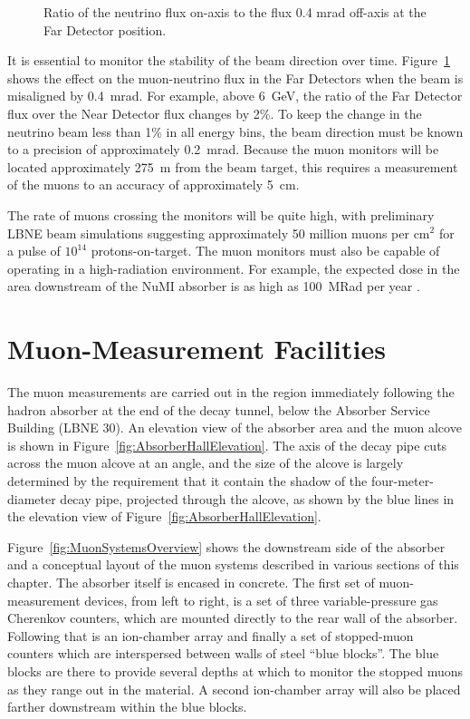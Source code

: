 \begin{figure}[htbp]
\begin{center}
\caption[Ratio of the flux on-axis to the flux 0.4~mrad off-axis]
{ Ratio of the neutrino flux on-axis to the flux 0.4 mrad off-axis at the Far
Detector position.}
\label{fig:fluxRatio}
\end{center}
\end{figure}

It is essential to monitor the stability of the beam direction over
time. Figure~\ref{fig:fluxRatio} shows the effect on the muon-neutrino
flux in the Far Detectors when the beam is misaligned by 0.4~mrad.  
For example, above 6~GeV, the ratio of the Far Detector flux over 
the Near Detector flux changes by 2\%.  
To keep the change in the neutrino beam less than 1\% in all energy bins,
the beam direction must be known to a precision of approximately 0.2~mrad. 
Because the muon monitors will be located approximately 275~m
from the beam target, this requires a measurement of the muons to an
accuracy of approximately 5~cm.


The rate of muons crossing the monitors will be quite high, with
preliminary LBNE beam simulations suggesting approximately 50 million
muons per cm$^{2}$ for a pulse of $10^{14}$ protons-on-target. The
muon monitors must also be capable of operating in a high-radiation
environment.  For example, the expected dose in the area downstream of
the NuMI absorber is as high as 100~MRad per year \cite{ref:NuMIBeamMonitors}.

%
%
\section{Muon-Measurement Facilities}

The muon measurements are carried out in the region immediately
following the hadron absorber at the end of the decay tunnel, below
the Absorber Service Building (LBNE 30).  An elevation view
of the absorber area and the muon alcove is shown in Figure~\ref{fig:AbsorberHallElevation}. 
The axis of the decay pipe cuts across the muon alcove at an angle, and the size of the alcove
is largely determined by the requirement that it contain the
shadow of the four-meter-diameter decay pipe, projected through the
alcove, as shown by the blue lines in the elevation view of Figure~\ref{fig:AbsorberHallElevation}. 

Figure~\ref{fig:MuonSystemsOverview} shows the downstream side of the
absorber and a conceptual layout of the muon systems described in various sections of this
chapter.  
The absorber itself is encased in concrete. The first set of
muon-measurement devices, from left to right, is a
set of three variable-pressure gas Cherenkov counters, which are
mounted directly to the rear wall of the absorber. Following that is an ion-chamber array and finally a set of stopped-muon counters which are interspersed between walls of
steel ``blue blocks''.   The blue blocks are there to provide several
depths at which to monitor the stopped muons as they range out in the
material. A second ion-chamber array will also be placed farther downstream within the blue blocks.

